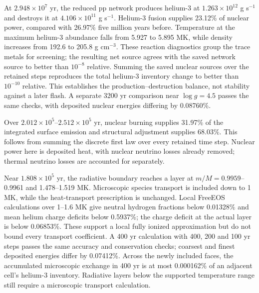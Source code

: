 \documentclass[11pt,letterpaper]{article}
\begin{document}
At $2.948\times10^7$ yr, the reduced pp network produces helium-3 at
$1.263\times10^{12}$ g s$^{-1}$ and destroys it at
$4.106\times10^{11}$ g s$^{-1}$. Helium-3 fusion supplies 23.12\% of
nuclear power, compared with 26.97\% five million years before.
Temperature at the maximum helium-3 abundance falls from 5.927 to
5.895 MK, while density increases from 192.6 to 205.8 g cm$^{-3}$.
These reaction diagnostics group the trace metals for screening; the
resulting net source agrees with the saved network source to better than
$10^{-8}$ relative. Summing the saved nuclear sources over the retained
steps reproduces the total helium-3 inventory change to better than
$10^{-10}$ relative. This establishes the production--destruction balance,
not stability against a later flash.
A separate 3200 yr comparison near $\log g=4.5$ passes the same checks,
with deposited nuclear energies differing by 0.08760\%.

Over $2.012\times10^5$--$2.512\times10^5$ yr, nuclear burning supplies
31.97\% of the integrated surface emission and structural adjustment supplies
68.03\%. This follows from summing the discrete first law over every retained
time step. Nuclear power here is deposited heat, with nuclear neutrino losses
already removed; thermal neutrino losses are accounted for separately.

Near $1.808\times10^5$ yr, the radiative boundary reaches a layer at
$m/M=0.9959$--0.9961 and 1.478--1.519 MK. Microscopic species transport
is included down to 1 MK, while the heat-transport prescription is unchanged.
Local FreeEOS calculations over 1--1.6 MK give neutral hydrogen fractions
below 0.01328\% and mean helium charge deficits below 0.5937\%; the charge
deficit at the actual layer is below 0.06853\%. These support a local
fully ionized approximation but do not bound every transport coefficient.
A 400 yr calculation with 400, 200 and 100 yr steps passes the same
accuracy and conservation checks; coarsest and finest deposited energies
differ by 0.07412\%. Across the newly included faces, the accumulated
microscopic exchange in 400 yr is at most 0.000162\% of an adjacent
cell's helium-3 inventory. Radiative layers below the supported temperature
range still require a microscopic transport calculation.
\end{document}
